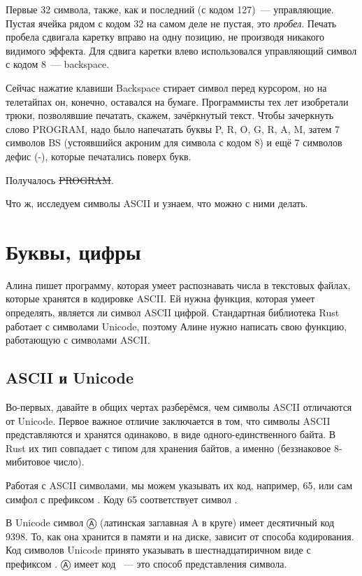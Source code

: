 Первые 32 символа, также, как и последний (с кодом 127)~--- управляющие.
Пустая ячейка рядом с кодом 32 на самом деле не пустая, это {\em пробел}.
Печать пробела сдвигала каретку вправо на одну позицию, не производя никакого видимого эффекта.
Для сдвига каретки влево использовался управляющий символ с кодом 8~--- backspace.

Сейчас нажатие клавиши Backspace стирает символ перед курсором, но на телетайпах он, конечно, оставался на бумаге.
Программисты тех лет изобретали трюки, позволявшие печатать, скажем, зачёркнутый текст.
Чтобы зачеркнуть слово PROGRAM, надо было напечатать буквы P, R, O, G, R, A, M, затем 7 символов BS (устоявшийся акроним для символа с кодом 8) и ещё 7 символов дефис (-), которые печатались поверх букв.

Получалось \sout{PROGRAM}.

Что ж, исследуем символы ASCII и узнаем, что можно с ними делать.

\section{Буквы, цифры}

\begin{Exercise}
  \Question
  Алина пишет программу, которая умеет распознавать числа в текстовых файлах, которые хранятся в кодировке ASCII.
  Ей нужна функция, которая умеет определять, является ли символ ASCII цифрой.
  Стандартная библиотека Rust работает с символами Unicode, поэтому Алине нужно написать свою функцию, работающую с символами ASCII.
\end{Exercise}

\subsection{ASCII и Unicode}

Во-первых, давайте в общих чертах разберёмся, чем символы ASCII отличаются от Unicode.
Первое важное отличие заключается в том, что символы ASCII представляются и хранятся одинаково, в виде одного-единственного байта.
В Rust их тип совпадает с типом для хранения байтов, а именно  (беззнаковое 8-мибитовое число).

Работая с ASCII символами, мы можем указывать их код, например, 65, или сам симфол с префиксом .
Коду 65 соответствует символ .

В Unicode символ Ⓐ (латинская заглавная A в круге) имеет десятичный код 9398.
То, как она хранится в памяти и на диске, зависит от способа кодирования.
Код символов Unicode принято указывать в шестнадцатиричном виде с префиксом .
Ⓐ имеет код ~--- это способ представления символа.

